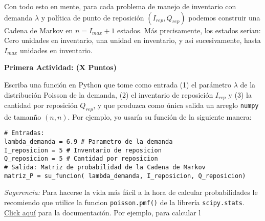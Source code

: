 \documentclass[ a4paper, twoside, 11pt]{article}
\begin{document}
\begin{problem}
Con todo esto en mente, para cada problema de manejo de inventario con demanda $\lambda$ y pol\'itica de punto de reposici\'on $(I_{rep},Q_{rep})$ podemos construir una Cadena de Markov en $n = I_{max} + 1$ estados. M\'as precisamente, los estados ser\'ian: Cero unidades en inventario, una unidad en inventario, y asi sucesivamente, hasta $I_{max}$ unidades en inventario. 

\textbf{Primera Actividad: (X Puntos)}

Escriba una funci\'on en Python que tome como entrada (1) el par\'ametro $\lambda$ de la distribuci\'on Poisson de la demanda, (2) el inventario de reposici\'on $I_{rep}$ y (3) la cantidad por reposici\'on $Q_{rep}$, y que produzca como \'unica salida un arreglo {\tt numpy} de taman\~no $(n,n)$. Por ejemplo, yo usar\'ia su funci\'on de la siguiente manera:
\halfskip

\begin{center}
\begin{minipage}{0.8\textwidth}
\begin{verbatim}
# Entradas:
lambda_demanda = 6.9 # Parametro de la demanda
I_reposicion = 5 # Inventario de reposicion
Q_reposicion = 5 # Cantidad por reposicion
# Salida: Matriz de probabilidad de la Cadena de Markov
matriz_P = su_funcion( lambda_demanda, I_reposicion, Q_reposicion)
\end{verbatim}
\end{minipage}
\end{center}
\halfskip

\emph{Sugerencia:} Para hacerse la vida m\'as f\'acil a la hora de calcular probabilidades le recomiendo que utilice la funcion {\tt poisson.pmf()} de la librer\'ia {\tt scipy.stats}. \href{https://docs.scipy.org/doc/scipy/reference/generated/scipy.stats.poisson.html}{Click aqu\'i} para la documentaci\'on. Por ejemplo, para calcular l

\end{problem}
\vspace{\baselineskip}
\end{document}
